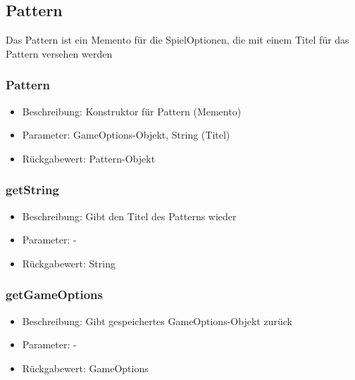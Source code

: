 \documentclass[a4paper]{scrreprt}
\begin{document}
    \subsection{Pattern}
    Das Pattern ist ein Memento für die SpielOptionen, die mit einem Titel für das Pattern versehen werden
    \subsubsection{Pattern}
    \begin{itemize}
        \item Beschreibung: Konstruktor für Pattern (Memento)
        \item Parameter: GameOptions-Objekt, String (Titel)
        \item Rückgabewert: Pattern-Objekt
    \end{itemize}
    \subsubsection{getString}
    \begin{itemize}
        \item Beschreibung: Gibt den Titel des Patterns wieder
        \item Parameter: -
        \item Rückgabewert: String
    \end{itemize}
    \subsubsection{getGameOptions}
    \begin{itemize}
        \item Beschreibung: Gibt gespeichertes GameOptions-Objekt zurück
        \item Parameter: -
        \item Rückgabewert: GameOptions
    \end{itemize}
\end{document}
